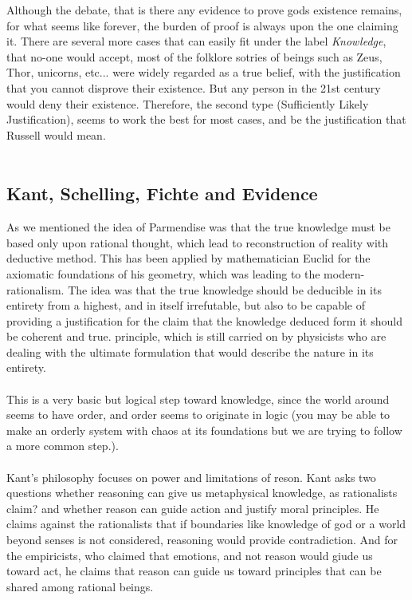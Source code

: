 \documentclass[10pt,a4paper]{article}
\begin{document}
                    Although the debate, that is there any evidence to prove gods existence remains, for what seems like forever, the burden of proof is always upon the one claiming it. There are several more cases that can easily fit under the label \textit{Knowledge}, that no-one would accept, most of the folklore sotries of beings such as Zeus, Thor, unicorns, etc... were widely regarded as a true belief, with the justification that you cannot disprove their existence. But any person in the 21st century would deny their existence. Therefore, the second type (Sufficiently Likely Justification), seems to work the best for most cases, and be the justification that Russell would mean.\cite{Russell1952}
                    \\
                    \\
                    \subsection{Kant, Schelling, Fichte and Evidence}  As we mentioned the idea of Parmendise was that the true knowledge must be based only upon rational thought, which lead to reconstruction of reality with deductive method. This has been applied by mathematician Euclid for the axiomatic foundations of his geometry, which was leading to the modern-rationalism. The idea was that the true knowledge should be deducible in its entirety from a highest,  and in itself irrefutable, but also to be capable of providing a justification for the claim that the knowledge deduced form it should be coherent and true. principle, which is still carried on by physicists who are dealing with the ultimate formulation that would describe the nature in its entirety. 
                    \\
                    \\
                    This is a very basic but logical step toward knowledge, since the world around seems to have order, and order seems to originate in logic (you may be able to make an orderly system with chaos at its foundations but we are trying to follow a more common step.).\cite{Kuppers2018-vv}
                    \\
                    \\
                    Kant's philosophy focuses on power and limitations of reson. Kant asks two questions whether reasoning can give us metaphysical knowledge, as rationalists claim? and whether reason can guide action and justify moral principles. He claims against the rationalists that if boundaries like knowledge of god or a world beyond senses is not considered, reasoning would provide contradiction. And for the empiricists, who claimed that emotions, and not reason would giude us toward act, he claims that reason can guide us toward principles that can be shared among rational beings.
\end{document}
